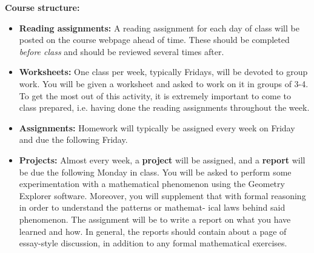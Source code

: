 \documentclass[11pt]{article}
\begin{document}

\pagebreak

\textbf{\large Course structure:}

\begin{itemize}
	\item \textbf{Reading assignments:}
			A reading assignment for each day of class will be posted on the course webpage ahead of time. These should be completed \emph{before class} and should be reviewed several times after. 
	\item  \textbf{Worksheets:} One class per week, typically Fridays, will be devoted to group work. You will be given a worksheet and asked to work on it in groups of 3-4. To get the most out of this activity, it is extremely important to come to class prepared, i.e. having done the reading assignments throughout the week. 
	\item \textbf{Assignments:} Homework will typically be assigned every week on Friday and due the following Friday.
	\item \textbf{Projects:} Almost every week, a \textbf{project} will be assigned, and a \textbf{report} will be due the following Monday in class. You will be asked to perform some experimentation with a mathematical phenomenon using the Geometry Explorer software. Moreover, you will supplement that with formal reasoning in order to understand the patterns or mathemat- ical laws behind said phenomenon. The assignment will be to write a report on what you have learned and how. In general, the reports should contain about a page of essay-style discussion, in addition to any formal mathematical exercises.

\end{itemize}
\end{document}
